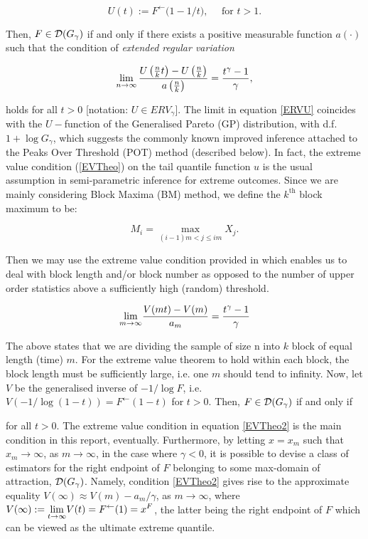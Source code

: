 \begin{equation*}
U(t):=   F^{\leftarrow} \bigl( 1-1/t\bigr), \quad \mbox{ for } t >  1.
\end{equation*}


Then, $F\in {\ensuremath{\mathcal{D}}}(G_{\gamma})$ if and only if there exists a positive  measurable function $a(\cdot)$ such that the condition of \emph{extended regular variation}


\begin{equation}\label{ERVU}
	\displaystyle {\lim_{n \rightarrow{\infty}}}\,\frac{U\left(\frac{n}{k}t\right)-U\left(\frac{n}{k}\right)}{a\left(\frac{n}{k}\right)}= \frac{t^{\gamma}-1}{\gamma},
\end{equation}


holds for all $t>0$ [notation: $U\in ERV_{\gamma}$]. The limit in equation \ref{ERVU} coincides with the $U-$function of the Generalised Pareto (GP) distribution, with d.f. $ 1+ \log G_ \gamma $, which suggests the commonly known improved inference attached to the Peaks Over Threshold (POT) method (described below). In fact, the extreme value condition (\ref{EVTheo}) on the tail quantile function $ u $ is the usual assumption in semi-parametric inference for extreme outcomes. Since we are mainly considering Block Maxima (BM) method, we define the $ k^{\text{th}} $ block maximum to be:

\begin{equation}
M_i = \max _{(i -1) m < j \le i m} X_j.
\end{equation}

\noindent Then we may use the extreme value condition provided in \citet{FdeH:15} which enables us to deal with block length and/or block number as opposed to the number of upper order statistics above a sufficiently high (random) threshold.

\begin{equation} \label{EVTheo2}
\displaystyle {\lim_{m \rightarrow{\infty}}} \frac{V(mt) - V(m)}{a_m} = \frac{t^\gamma - 1}{\gamma}
\end{equation}


The above states that we are dividing the sample of size n into $k$ block of equal length (time) $m$. For the extreme value theorem to hold within each block, the block length must be sufficiently large, i.e. one $m$ should tend to infinity. Now, let $V$ be the generalised inverse of $ -1/\log F $, i.e. $ V(-1 / \log( 1 - t ) ) = F^{\leftarrow}( 1 - t )$ for $ t > 0 $. Then, $F \in {\ensuremath{\mathcal{D}}} ( G_\gamma )$ if and only if



\noindent for all $ t > 0 $. The extreme value condition in equation \ref{EVTheo2} is the main condition in this report, eventually. Furthermore, by letting $ x = x_m $ such that $ x_m \rightarrow \infty $, as $ m \rightarrow \infty $, in the case where $ \gamma < 0 $, it is possible to devise a class of estimators for the right endpoint of $F$ belonging to some max-domain of attraction, $ {\mathcal{D}} (G_\gamma) $.  Namely, condition \ref{EVTheo2} gives rise to the approximate equality $ V(\infty) \approx V(m) - a_m / \gamma $, as $ m \rightarrow \infty $, where $ V(\infty ) := \displaystyle {\lim_{t \rightarrow{\infty}}} V(t) = F^{\leftarrow}(1) = x^F $, the latter being the right endpoint of $F$ which can be viewed as the ultimate extreme quantile.


